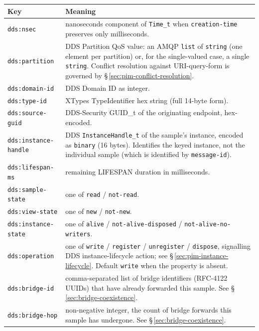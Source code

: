 \documentclass{../styles/zerodds-vendor-spec}
\begin{document}
\begin{longtable}{p{4cm}p{8cm}}
  \toprule
  \textbf{Key} & \textbf{Meaning} \\
  \midrule
  \endhead
  \texttt{dds:nsec}       & nanoseconds component of \texttt{Time\_t} when \texttt{creation-time} preserves only milliseconds. \\
  \texttt{dds:partition}  & DDS Partition QoS value: an AMQP \texttt{list} of \texttt{string} (one element per partition) or, for the single-valued case, a single \texttt{string}. Conflict resolution against URI-query-form is governed by \S\,\ref{sec:pim-conflict-resolution}. \\
  \texttt{dds:domain-id}  & DDS Domain ID as integer. \\
  \texttt{dds:type-id}    & XTypes TypeIdentifier hex string (full 14-byte form). \\
  \texttt{dds:source-guid} & DDS-Security GUID\_t of the originating endpoint, hex-encoded. \\
  \texttt{dds:instance-handle} & DDS \texttt{InstanceHandle\_t} of the sample's instance, encoded as \texttt{binary} (16 bytes). Identifies the keyed instance, not the individual sample (which is identified by \texttt{message-id}). \\
  \texttt{dds:lifespan-ms} & remaining LIFESPAN duration in milliseconds. \\
  \texttt{dds:sample-state} & one of \texttt{read} / \texttt{not-read}. \\
  \texttt{dds:view-state}   & one of \texttt{new} / \texttt{not-new}. \\
  \texttt{dds:instance-state} & one of \texttt{alive} / \texttt{not-alive-disposed} / \texttt{not-alive-no-writers}. \\
  \texttt{dds:operation}  & one of \texttt{write} / \texttt{register} / \texttt{unregister} / \texttt{dispose}, signalling DDS instance-lifecycle action; see \S\,\ref{sec:pim-instance-lifecycle}. Default \texttt{write} when the property is absent. \\
  \texttt{dds:bridge-id}  & comma-separated list of bridge identifiers (RFC-4122 UUIDs) that have already forwarded this sample. See \S\,\ref{sec:bridge-coexistence}. \\
  \texttt{dds:bridge-hop} & non-negative integer, the count of bridge forwards this sample has undergone. See \S\,\ref{sec:bridge-coexistence}. \\
  \bottomrule
\end{longtable}
\end{document}
